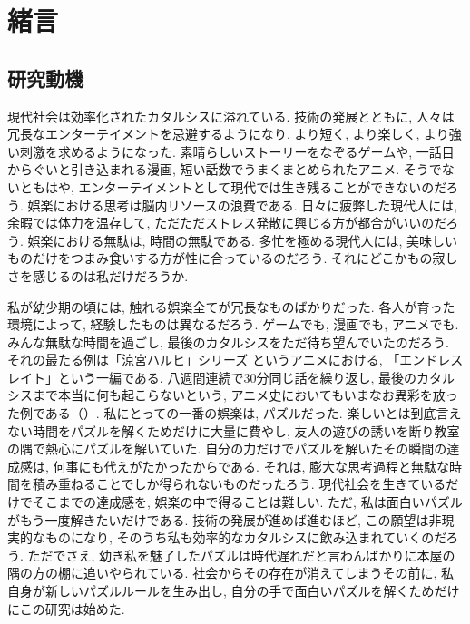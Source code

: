 \chapter{緒言}
\section{研究動機}\label{section:Motivation}
現代社会は効率化されたカタルシスに溢れている. 技術の発展とともに, 人々は冗長なエンターテイメントを忌避するようになり, より短く, より楽しく, より強い刺激を求めるようになった. 素晴らしいストーリーをなぞるゲームや, 一話目からぐいと引き込まれる漫画, 短い話数でうまくまとめられたアニメ. そうでないともはや, エンターテイメントとして現代では生き残ることができないのだろう. 娯楽における思考は脳内リソースの浪費である. 日々に疲弊した現代人には, 余暇では体力を温存して, ただただストレス発散に興じる方が都合がいいのだろう. 娯楽における無駄は, 時間の無駄である. 多忙を極める現代人には, 美味しいものだけをつまみ食いする方が性に合っているのだろう. それにどこかもの寂しさを感じるのは私だけだろうか.

私が幼少期の頃には, 触れる娯楽全てが冗長なものばかりだった. 各人が育った環境によって, 経験したものは異なるだろう. ゲームでも, 漫画でも, アニメでも. みんな無駄な時間を過ごし, 最後のカタルシスをただ待ち望んでいたのだろう. それの最たる例は「涼宮ハルヒ」シリーズ \cite{web:Haruhi}というアニメにおける, 「エンドレスレイト」という一編である. 八週間連続で30分同じ話を繰り返し, 最後のカタルシスまで本当に何も起こらないという, アニメ史においてもいまなお異彩を放った例である（\cite{web:EndlessEight}）.
私にとっての一番の娯楽は, パズルだった. 楽しいとは到底言えない時間をパズルを解くためだけに大量に費やし, 友人の遊びの誘いを断り教室の隅で熱心にパズルを解いていた. 自分の力だけでパズルを解いたその瞬間の達成感は, 何事にも代えがたかったからである. それは, 膨大な思考過程と無駄な時間を積み重ねることでしか得られないものだったろう. 現代社会を生きているだけでそこまでの達成感を, 娯楽の中で得ることは難しい. ただ, 私は面白いパズルがもう一度解きたいだけである. 技術の発展が進めば進むほど, この願望は非現実的なものになり, そのうち私も効率的なカタルシスに飲み込まれていくのだろう. ただでさえ, 幼き私を魅了したパズルは時代遅れだと言わんばかりに本屋の隅の方の棚に追いやられている. 社会からその存在が消えてしまうその前に, 私自身が新しいパズルルールを生み出し, 自分の手で面白いパズルを解くためだけにこの研究は始めた.

